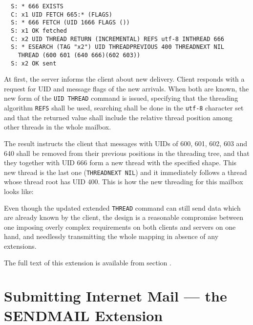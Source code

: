 \documentclass[trojita]{subfiles}
\begin{document}
\begin{verbatim}
  S: * 666 EXISTS
  C: x1 UID FETCH 665:* (FLAGS)
  S: * 666 FETCH (UID 1666 FLAGS ())
  S: x1 OK fetched
  C: x2 UID THREAD RETURN (INCREMENTAL) REFS utf-8 INTHREAD 666
  S: * ESEARCH (TAG "x2") UID THREADPREVIOUS 400 THREADNEXT NIL
    THREAD (600 601 (640 666)(602 603))
  S: x2 OK sent
\end{verbatim}

At first, the server informs the client about new delivery.  Client responds with a request for UID and message flags of
the new arrivals.  When both are known, the new form of the {\tt UID THREAD} command is issued, specifying that the
threading algorithm {\tt REFS} shall be used, searching shall be done in the {\tt utf-8} character set and that the
returned value shall include the relative thread position among other threads in the whole mailbox.

The result instructs the client that messages with UIDs of 600, 601, 602, 603 and 640 shall be removed from their
previous positions in the threading tree, and that they together with UID 666 form a new thread with the specified
shape.  This new thread is the last one ({\tt THREADNEXT NIL}) and it immediately follows a thread whose thread root has
UID 400.  This is how the new threading for this mailbox looks like:

\vspace{5mm}


\vspace{5mm}

Even though the updated extended {\tt THREAD} command can still send data which are already known by the client, the
design is a reasonable compromise between one imposing overly complex requirements on both clients and servers on one
hand, and needlessly transmitting the whole mapping in absence of any extensions.

The full text of this extension is available from section .

\section{Submitting Internet Mail --- the SENDMAIL Extension}
\label{sec:draft-sendmail}
\end{document}
